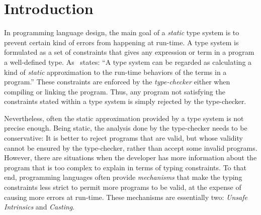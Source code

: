 
\chapter{Introduction}

In programming language design, the main goal of a \emph{static} type system is to prevent certain kind of errors from happening at run-time.
A type system is formulated as a set of constraints that gives any expression or term in a program a well-defined type.
As~\cite{pierceTypesProgrammingLanguages2002} states: ``A type system can be regarded as calculating a kind of \emph{static} approximation to the run-time behaviors of the terms in a program.''
These constraints are enforced by the \emph{type-checker} either when compiling or linking the program.
Thus, any program not satisfying the constraints stated within a type system is simply rejected by the type-checker.

Nevertheless, often the static approximation provided by a type system is not precise enough.
Being static, the analysis done by the type-checker needs to be conservative:
It is better to reject programs that are valid,
but whose validity cannot be ensured by the type-checker,
rather than accept some invalid programs.
However, there are situations when the developer has more information
about the program that is too complex to explain in terms of typing constraints.
To that end, programming languages often provide \emph{mechanisms} that 
make the typing constraints less strict
to permit more programs to be valid,
at the expense of causing more errors at run-time.
These mechanisms are essentially two:
\emph{Unsafe Intrinsics} and \emph{Casting}.

